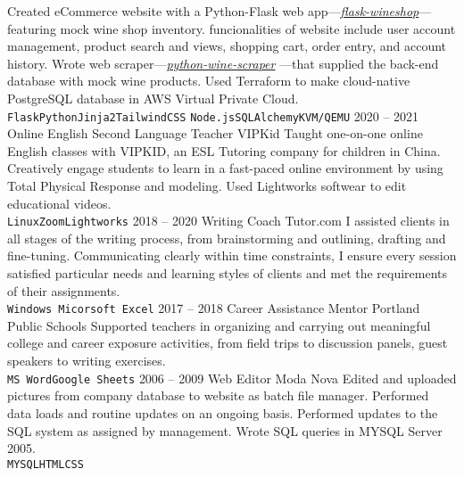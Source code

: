 \documentclass[9pt]{developercv} %
\begin{document}
\begin{entrylist}
{		Created eCommerce website with a Python-Flask web app—{\href{https://Github.com/eriklolson/flask-wineshop}{\itshape flask-wineshop}}—
		featuring mock wine shop inventory. funcionalities of website include user account management, product search and views, shopping cart, 
		order entry, and account history. Wrote web scraper—{\href{https://Github.com/eriklolson/python-wine-scraper}{\itshape python-wine-scraper}}
		—that supplied the back-end database with mock wine products. Used Terraform to make cloud-native PostgreSQL database in AWS Virtual Private 
		Cloud.\\ \texttt{Flask}\slashsep\texttt{Python}\slashsep\texttt{Jinja2}\slashsep\texttt{TailwindCSS}
		\slashsep\texttt{Node.js}\slashsep\texttt{SQLAlchemy}\slashsep\texttt{KVM/QEMU}}
	\entry
		{2020 -- 2021}
		{Online English Second Language Teacher}
		{VIPKid}
		{Taught one-on-one online English classes with VIPKID, an ESL Tutoring company for children in China. Creatively engage students to learn in 		a fast-paced online environment by using Total Physical Response and modeling. Used Lightworks softwear to edit educational videos.
		\\ \texttt{Linux}\slashsep\texttt{Zoom}\slashsep\texttt{Lightworks}}
	\entry
		{2018 -- 2020}
		{Writing Coach}
		{Tutor.com}
		{I assisted clients in all stages of the writing process, from
		brainstorming and outlining, drafting and fine-tuning. Communicating clearly
		within time constraints, I ensure every session satisfied particular needs and
		learning styles of clients and met the requirements of their assignments.
		\\ \texttt{Windows}\slashsep\texttt{ Micorsoft Excel}}
	\entry
		{2017 -- 2018}
		{Career Assistance Mentor}
		{Portland Public Schools}
		{Supported teachers in organizing and carrying out meaningful college and
		career exposure activities, from field trips to discussion panels, guest
		speakers to writing exercises.
		\\ \texttt{MS Word}\slashsep\texttt{Google Sheets}}
	\entry
		{2006 -- 2009}
		{Web Editor}
		{Moda Nova}
		{Edited and uploaded pictures from company database to website as batch file manager. Performed data loads and routine updates on an ongoing 		basis. Performed updates to the SQL system as assigned by management. Wrote SQL queries in MYSQL Server 2005.
		\\ \texttt{MYSQL}\slashsep\texttt{HTML}\slashsep\texttt{CSS}}
\end{entrylist}
	\vspace{56pt}
\end{document}
